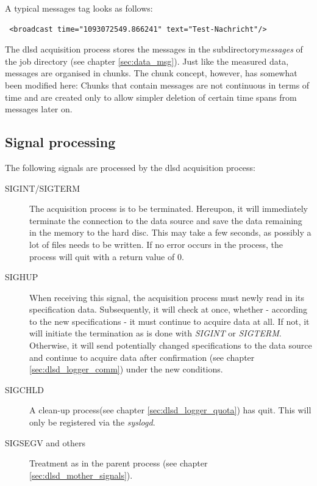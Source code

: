 \documentclass[a4paper,12pt,BCOR6mm,bibtotoc,idxtotoc]{scrbook}
\begin{document}
A typical messages tag looks as follows:

\begin{lstlisting} <broadcast time="1093072549.866241" text="Test-Nachricht"/> \end{lstlisting}

The dlsd acquisition process stores the messages in the subdirectory\textit{messages} of the job directory (see chapter \ref{sec:data_msg}). Just like the measured data, messages are organised in chunks. The chunk concept, however, has somewhat been modified here: Chunks that contain messages are not continuous in terms of time and are created only to allow simpler deletion of certain time spans from messages later on.


\subsection{Signal processing} \label{sec:dlsd_logger_signals}

The following signals are processed by the dlsd acquisition process:

\begin{description} 
\item[SIGINT/SIGTERM] The acquisition process is to be terminated. Hereupon, it will immediately terminate the connection to the data source and save the data remaining in the memory to the hard disc. This may take a few seconds, as possibly a lot of files needs to be written. If no error occurs in the process, the process will quit with a return value of 0. 
\item[SIGHUP] When receiving this signal, the acquisition process must newly read in its specification data. Subsequently, it will check at once, whether - according to the new specifications - it must continue to acquire data at all. If not, it will initiate the termination as is done with \textit{SIGINT} or \textit{SIGTERM}. Otherwise, it will send potentially changed specifications to the data source and continue to acquire data after confirmation (see chapter \ref{sec:dlsd_logger_comm}) under the new conditions. 
\item[SIGCHLD] A \glqq clean-up process\grqq{}(see chapter \ref{sec:dlsd_logger_quota}) has quit. This will only be registered via the \textit{syslogd}. 
\item[SIGSEGV and others] Treatment as in the parent process (see chapter \ref{sec:dlsd_mother_signals}). \end{description}
\end{document}
